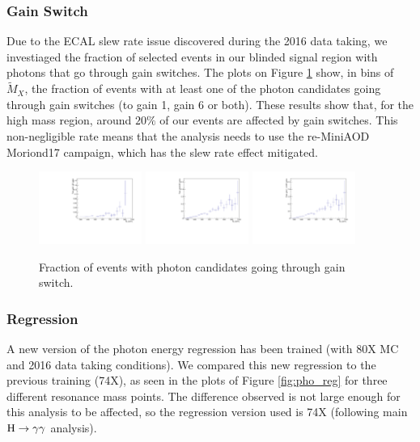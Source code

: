 \subsubsection{Gain Switch}

Due to the ECAL slew rate issue discovered during the 2016 data taking, we investiaged the fraction of selected events in our blinded signal region with photons that go through gain switches. 
The plots on Figure \ref{fig:gain_switch}  show, in bins of $\tilde{M}_{X}$, the fraction of events with at least one of the photon candidates going through gain switches (to gain 1, gain 6 or both). 
These results show that, for the high mass region, around $20\%$ of our events are affected by gain switches. 
This non-negligible rate means that the analysis needs to use the re-MiniAOD Moriond17 campaign, which has the slew rate effect mitigated.

\begin{figure}[thb]
  \centering
  \includegraphics[width=0.3\textwidth]{figures/sec-photons/rg1}\hfil
  \includegraphics[width=0.3\textwidth]{figures/sec-photons/rg6}\hfil
  \includegraphics[width=0.3\textwidth]{figures/sec-photons/rg16}\hfil
  \caption{Fraction of events with photon candidates going through gain switch.}
  \label{fig:gain_switch}
\end{figure}

\subsubsection{Regression}

A new version of the photon energy regression has been trained (with 80X MC and 2016 data taking conditions). 
We compared this new regression to the previous training (74X), as seen in the plots of Figure \ref{fig:pho_reg} for three different resonance mass points. 
The difference observed is not large enough for this analysis to be affected, so the regression version used is 74X (following main $\mathrm{H}\to\gamma\gamma$ analysis).

